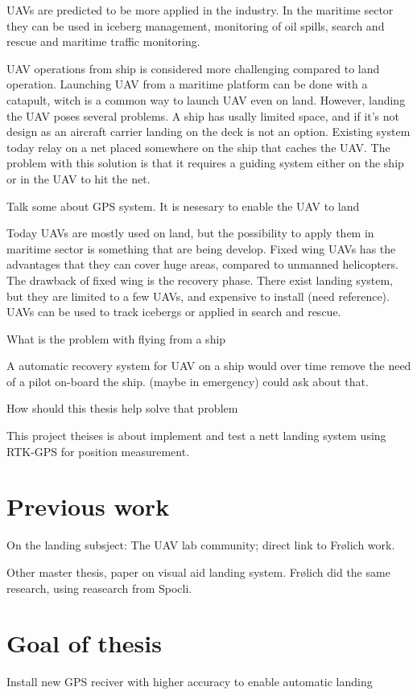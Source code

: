 UAVs are predicted to be more applied in the industry. In the maritime sector they can be used in iceberg management, monitoring of oil spills, search and rescue and maritime traffic monitoring.

UAV operations from ship is considered more challenging compared to land operation. Launching UAV from a maritime platform can be done with a catapult, witch is a common way to launch UAV even on land. However, landing the UAV poses several problems. A ship has usally limited space, and if it's not design as an aircraft carrier landing on the deck is not an option. Existing system today relay on a net placed somewhere on the ship that caches the UAV. The problem with this solution is that it requires a guiding  system either on the ship or in the UAV to hit the net.

Talk some about GPS system. It is nesesary to enable the UAV to land

Today UAVs are mostly used on land, but the possibility to apply them in maritime sector is something that are being develop. Fixed wing UAVs has the advantages that they can cover huge areas, compared to unmanned helicopters. The drawback of fixed wing is the recovery phase. There exist landing system, but they are limited to a few UAVs, and expensive to install (need reference). UAVs can be used to track icebergs or applied in search and rescue.

What is the problem with flying from a ship

A automatic recovery system for UAV on a ship would over time remove the need of a pilot on-board the ship. (maybe in emergency) could ask about that.  

How should this thesis help solve that problem

This project theises is about implement and test a nett landing system using RTK-GPS for position measurement.

\section{Previous work}
On the landing subsject: The UAV lab community; direct link to Frølich work. 

Other master thesis, paper on visual aid landing system. Frølich did the same research, using reasearch from Spocli.
\section{Goal of thesis}
Install new GPS reciver with higher accuracy to enable automatic landing
